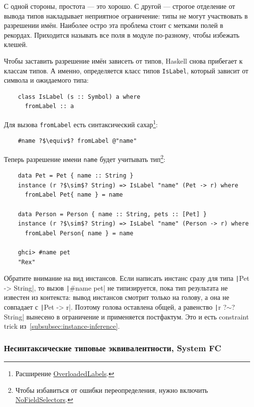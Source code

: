 С одной стороны, простота --- это хорошо.
С другой --- строгое отделение от вывода типов накладывает неприятное ограничение: типы не могут участвовать в разрешении имён.
Наиболее остро эта проблема стоит с метками полей в рекордах.
Приходится называть все поля в модуле по-разному, чтобы избежать клешей.

Чтобы заставить разрешение имён зависеть от типов, Haskell снова прибегает к классам типов.
А именно, определяется класс типов \texttt{IsLabel}, который зависит от символа и ожидаемого типа:
\begin{verbatim}
    class IsLabel (s :: Symbol) a where
      fromLabel :: a
\end{verbatim}
Для вызова \texttt{fromLabel} есть синтаксический сахар\footnote{Расширение \href{https://ghc.gitlab.haskell.org/ghc/doc/users_guide/exts/overloaded_labels.html}{OverloadedLabels}.}:
\begin{verbatim}
    #name ?$\equiv$? fromLabel @"name"
\end{verbatim}
Теперь разрешение имени \texttt{name} будет учитывать тип\footnote{Чтобы избавиться от ошибки переопределения, нужно включить \href{https://ghc.gitlab.haskell.org/ghc/doc/users_guide/exts/field_selectors.html\#extension-FieldSelectors}{NoFieldSelectors}.}:
\begin{verbatim}
    data Pet = Pet { name :: String }
    instance (r ?$\sim$? String) => IsLabel "name" (Pet -> r) where
      fromLabel Pet{ name } = name

    data Person = Person { name :: String, pets :: [Pet] }
    instance (r ?$\sim$? String) => IsLabel "name" (Person -> r) where
      fromLabel Person{ name } = name

    ghci> #name pet
    "Rex"
\end{verbatim}
Обратите внимание на вид инстансов.
Если написать инстанс сразу для типа \texttt|Pet -> String|, то вызов \texttt|#name pet| не типизируется, пока тип результата не известен из контекста: вывод инстансов смотрит только на голову, а она не совпадает с \texttt|Pet -> r|.
Поэтому голова оставлена общей, а равенство \texttt|r ?$\sim$? String| вынесено в ограничение и применяется постфактум.
Это и есть constraint trick из~\ref{subsubsec:instance-inference}.

\subsubsection{Несинтаксические типовые эквивалентности, System FC} \label{subsubsec:system-fc}

